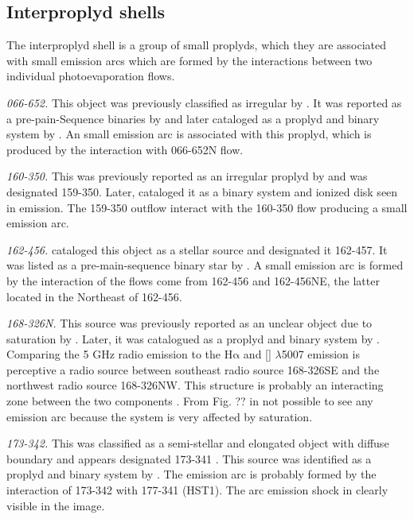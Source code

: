 \documentclass[iop, apj]{emulateapj}
\newcommand\oiii{[\ion{O}{3}]}
\newcommand\ha{\ensuremath{\mathrm{H\alpha}}}
\begin{document}
\subsection{Interproplyd shells}
\label{sec:interproplyd-group}

The interproplyd shell is a  group of small proplyds, which they are associated with small emission arcs which are formed by the interactions between two individual photoevaporation flows.

\textit{066-652.} This object was previously classified as irregular by \citet{ODell:1996a}. It was reported as a pre-pain-Sequence binaries by \citet{Reipurth:2007} and later cataloged as a proplyd and binary system by \citet{Ricci:2008a}. An small emission arc is associated with this proplyd, which is produced by the interaction with 066-652N flow. 
    
\textit{160-350.} This was previously reported as an irregular proplyd by \citet{Odell:1994} and was designated 159-350. Later, \citet{Ricci:2008a} cataloged it as a binary system and ionized disk seen in emission. The 159-350 outflow interact with the 160-350 flow producing a small emission arc.  

\textit{162-456.} \citet{ODell:1996a} cataloged this object as a stellar source and designated it 162-457. It was listed as a pre-main-sequence binary star by \citet{Reipurth:2007}. A small emission arc is formed by the interaction of the flows come from 162-456 and 162-456NE, the latter located in the Northeast of 162-456.     

\textit{168-326N.} This source was previously reported as an unclear object due to saturation by \citet{Odell:1994}. Later, it was catalogued as a proplyd and binary system by \citet{Ricci:2008a}. Comparing the 5 GHz radio emission to the \ha{} and \oiii{} $\lambda$5007 emission is perceptive a radio source between southeast radio source 168-326SE and the northwest radio source 168-326NW. This structure is probably an interacting zone between the two components \citep{Graham:2002}. From Fig. ?? in not possible to see any emission arc because the system is very affected by saturation.    

\textit{173-342.} This was classified as a semi-stellar and elongated object with diffuse boundary and appears designated 173-341 \citet{Odell:1994}. This source was identified as a proplyd and binary system by \citet{Ricci:2008a}. The emission arc is probably formed by the interaction of 173-342 with 177-341 (HST1). The arc emission shock in clearly visible in the image. 
\end{document}
